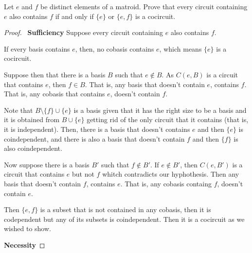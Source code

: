 \prob
{
    Let $e$ and $f$ be distinct elements of a matroid. Prove that every circuit containing $e$ also contains $f$ if and only if 
    $\{e\}$ or $\{e, f\}$ is a cocircuit.
}
\begin{proof}
    $\,$\pn
    \textbf{Sufficiency}\pn
        Suppose every circuit containing $e$ also contains $f$.\pn 
        
        If every basis contains $e$, then, no cobasis contains $e$, which means $\{e\}$ is a
        cocircuit.\pn
        
        Suppose then that there is a basis $B$ such that $e \notin B$. As $C(e, B)$ is a circuit that contains $e$, then
        $f \in B$. That is, any basis that doesn't contain $e$, contains $f$. That is, any cobasis that contains $e$, doesn't 
        contain $f$.\pn 
        
        Note that $B \setminus \{f\} \cup \{e\}$ is a basis given that it has the right size to be a basis and
        it is obtained from $B \cup \{e\}$ getting rid of the only circuit that it contains (that is, it is independent). Then, there
        is a basis that doesn't contains $e$ and then $\{e\}$ is coindependent, and there is also a basis that doesn't contain $f$ and then
        $\{f\}$ is also coindependent.\pn
        
        Now suppose there is a basis $B'$ such that $f \notin B'$. If $e \notin B'$, then $C(e, B')$ is a circuit that contains
        $e$ but not $f$ whitch contradicts our hyphothesis. Then any basis that doesn't contain $f$, contains $e$. That is,
        any cobasis containg $f$, doesn't contain $e$.\pn
        
        Then $\{e, f\}$ is a subset that is not contained in any cobasis, then it is codependent but any of its subsets is coindependent.
        Then it is a cocircuit as we wished to show.
        
    \textbf{Necessity}\pn
\end{proof}